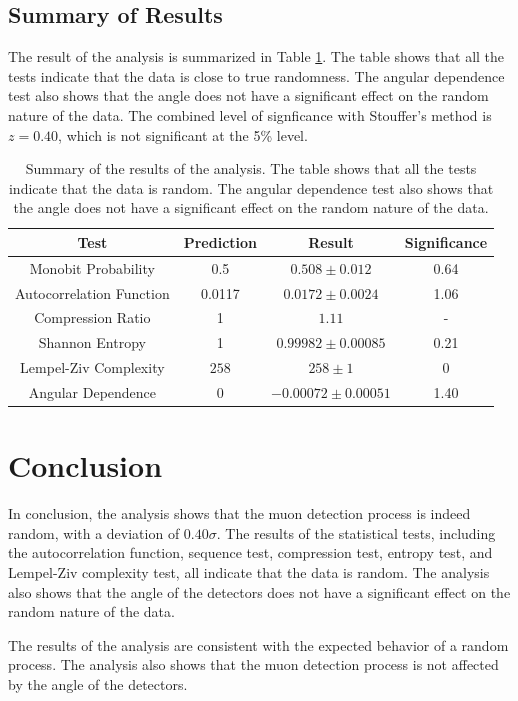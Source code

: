 \subsection{Summary of Results}
The result of the analysis is summarized in Table \ref{tab:summary}. The table shows that all the tests indicate that the data is close to true randomness. The angular dependence test also shows that the angle does not have a significant effect on the random nature of the data. The combined level of signficance with Stouffer's method \cite {stouffer1949american} is $z=0.40$, which is not significant at the 5\% level. 
\begin{table}
\centering
\begin{tabular}{|c|c|c|c|}
\hline
Test & Prediction & Result & Significance\\
\hline
Monobit Probability & 0.5 & $0.508 \pm 0.012$ & 0.64 \\
\hline
Autocorrelation Function & 0.0117 & $0.0172 \pm 0.0024$ & 1.06\\
\hline
Compression Ratio & 1 & $1.11$ & - \\
\hline
Shannon Entropy & 1 & $0.99982 \pm 0.00085$ & 0.21\\
\hline
Lempel-Ziv Complexity & $258$ & $258 \pm 1$ & 0 \\
\hline
Angular Dependence & 0 & $-0.00072 \pm 0.00051$ & 1.40\\
\hline
\end{tabular}
\caption{Summary of the results of the analysis. The table shows that all the tests indicate that the data is random. The angular dependence test also shows that the angle does not have a significant effect on the random nature of the data.}
\label{tab:summary}
\end{table}

\section{Conclusion}
In conclusion, the analysis shows that the muon detection process is indeed random, with a deviation of $0.40\sigma$. The results of the statistical tests, including the autocorrelation function, sequence test, compression test, entropy test, and Lempel-Ziv complexity test, all indicate that the data is random. The analysis also shows that the angle of the detectors does not have a significant effect on the random nature of the data.

The results of the analysis are consistent with the expected behavior of a random process. The analysis also shows that the muon detection process is not affected by the angle of the detectors. 

